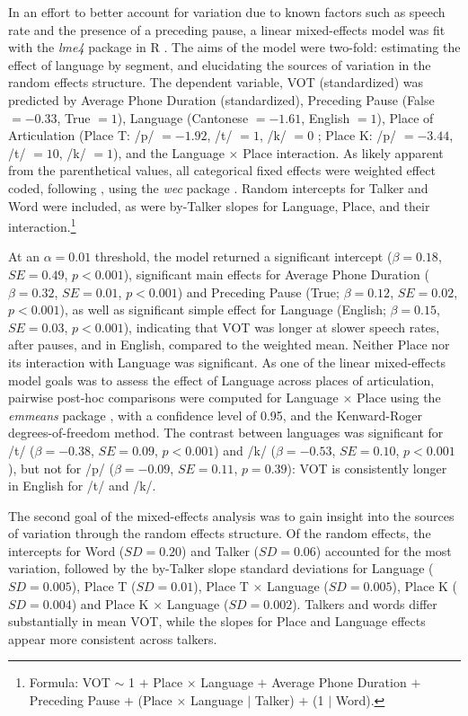 In an effort to better account for variation due to known factors such as speech rate and the presence of a preceding pause, a linear mixed-effects model was fit with the \textit{lme4} package \citep{bates_2015_lme4} in R \citep{r_2021}. The aims of the model were two-fold: estimating the effect of language by segment, and elucidating the sources of variation in the random effects structure. The dependent variable, VOT (standardized) was predicted by Average Phone Duration (standardized), Preceding Pause (False $=-0.33$, True $=1$), Language (Cantonese $=-1.61$, English $=1$), Place of Articulation (Place T: /p/ $=-1.92$, /t/ $=1$, /k/ $=0$ ; Place K: /p/ $=-3.44$, /t/ $=10$, /k/ $=1$), and the Language $\times$ Place interaction. As likely apparent from the parenthetical values, all categorical fixed effects were weighted effect coded, following \citet{chodroff_2017_structure}, using the  \textit{wec} package \citep{nieuwenhuis_2017_weighted}. Random intercepts for Talker and Word were included, as were by-Talker slopes for Language, Place, and their interaction.\footnote{Formula: VOT $\sim$ 1 $+$ Place $\times$ Language $+$ Average Phone Duration $+$ Preceding Pause $+$ (Place $\times$ Language $|$ Talker) $+$ (1 $|$ Word).}

At an $\alpha=0.01$ threshold, the model returned a significant intercept ($\beta=0.18$, $SE=0.49$, $p<0.001$), significant main effects for Average Phone Duration ($\beta=0.32$, $SE=0.01$, $p<0.001$) and Preceding Pause (True; $\beta=0.12$, $SE=0.02$, $p<0.001$), as well as significant simple effect for Language (English; $\beta=0.15$, $SE=0.03$, $p<0.001$), indicating that VOT was longer at slower speech rates, after pauses, and in English, compared to the weighted mean. Neither Place nor its interaction with Language was significant. As one of the linear mixed-effects model goals was to assess the effect of Language across places of articulation, pairwise post-hoc comparisons were computed for Language $\times$ Place using the \textit{emmeans} package \citep{lenth_2021_emmeans}, with a confidence level of 0.95, and the Kenward-Roger degrees-of-freedom method. The contrast between languages was significant for /t/ ($\beta=-0.38$, $SE=0.09$, $p<0.001$) and /k/ ($\beta=-0.53$, $SE=0.10$, $p<0.001$), but not for /p/ ($\beta=-0.09$, $SE=0.11$, $p=0.39$): VOT is consistently longer in English for /t/ and /k/.

The second goal of the mixed-effects analysis was to gain insight into the sources of variation through the random effects structure. Of the random effects, the intercepts for Word ($SD=0.20$) and Talker ($SD=0.06$) accounted for the most variation, followed by the by-Talker slope standard deviations for Language ($SD=0.005$), Place T ($SD=0.01$), Place T $\times$ Language ($SD=0.005$), Place K ($SD=0.004$) and Place K $\times$ Language ($SD=0.002$). Talkers and words differ substantially in mean VOT, while the slopes for Place and Language effects appear more consistent across talkers.


